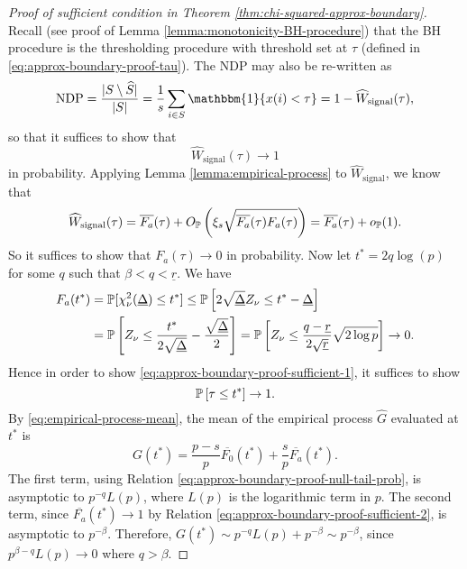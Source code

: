 \begin{proof}[Proof of sufficient condition in Theorem \ref{thm:chi-squared-approx-boundary}]
Recall (see proof of Lemma \ref{lemma:monotonicity-BH-procedure}) that the BH procedure is the thresholding procedure with threshold set at $\tau$ (defined in \eqref{eq:approx-boundary-proof-tau}).
The NDP may also be re-written as 
$$
\text{NDP} = \frac{|{S}\setminus\widehat{S}|}{|{S}|} = \frac{1}{s}\sum_{i\in S}\mathbbm{1}\{x(i) < \tau\} = 1 - \widehat{W}_\text{signal}(\tau),
$$
so that it suffices to show that 
\begin{equation} \label{eq:approx-boundary-proof-sufficient-1}
    \widehat{W}_\text{signal}(\tau)\to 1
\end{equation} in probability.
Applying Lemma \ref{lemma:empirical-process} to $\widehat{W}_\text{signal}$, we know that 
$$
\widehat{W}_\text{signal}(\tau) = \overline{F_a}(\tau) + O_\P\left(\xi_s\sqrt{\overline{F_a}(\tau)F_a(\tau)}\right) = \overline{F_a}(\tau) + o_\P(1).
$$
So it suffices to show that $F_a(\tau)\to 0$ in probability.
Now let $t^* = 2q\log(p)$ for some $q$ such that $\beta<q<\underline{r}$.
We have 
\begin{align}
    F_a(t^*) 
    &= \P[\chi^2_\nu(\underline{\Delta}) \le t^*]
    \le \P\left[2\sqrt{\underline{\Delta}}Z_\nu \le t^* - \underline{\Delta}\right] \nonumber \\
    &= \P\left[Z_\nu \le \frac{t^*}{2\sqrt{\underline{\Delta}}} - \frac{\sqrt{\underline{\Delta}}}{2}\right] 
    = \P\left[Z_\nu \le \frac{q-\underline{r}}{2\sqrt{\underline{r}}}\sqrt{2\log{p}}\right] \to 0. \label{eq:approx-boundary-proof-sufficient-2}
\end{align} 
Hence in order to show \eqref{eq:approx-boundary-proof-sufficient-1}, it suffices to show 
\begin{equation} \label{eq:approx-boundary-proof-sufficient-3}
    \P\left[\tau \le t^*\right] \to 1.
\end{equation}
By \eqref{eq:empirical-process-mean}, the mean of the empirical process $\widehat{G}$ evaluated at $t^*$ is
\begin{equation} \label{eq:approx-boundary-proof-sufficient-4}
    G(t^*) = \frac{p-s}{p}\overline{F_0}(t^*) + \frac{s}{p}\overline{F_a}(t^*).
\end{equation}
The first term, using Relation \eqref{eq:approx-boundary-proof-null-tail-prob}, is asymptotic to $p^{-q}L(p)$, where $L(p)$ is the logarithmic term in $p$.
The second term, since $\overline{F_a}(t^*)\to 1$ by Relation \eqref{eq:approx-boundary-proof-sufficient-2}, is asymptotic to $p^{-\beta}$.
Therefore, $G(t^*) \sim p^{-q}L(p) + p^{-\beta} \sim p^{-\beta}$, since 
$p^{\beta-q}L(p)\to0$ where $q>\beta$.


\end{proof}
